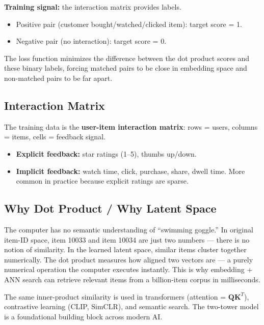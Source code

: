 \documentclass[11pt]{article}
\begin{document}
\textbf{Training signal:} the interaction matrix provides labels.
\begin{itemize}
    \item Positive pair (customer bought/watched/clicked item): target
      score = 1.
    \item Negative pair (no interaction): target score = 0.
\end{itemize}
The loss function minimizes the difference between the dot product scores
and these binary labels, forcing matched pairs to be close in embedding
space and non-matched pairs to be far apart.

\subsection{Interaction Matrix}
The training data is the \textbf{user-item interaction matrix}:
rows = users, columns = items, cells = feedback signal.
\begin{itemize}
    \item \textbf{Explicit feedback:} star ratings (1--5), thumbs up/down.
    \item \textbf{Implicit feedback:} watch time, click, purchase, share,
      dwell time. More common in practice because explicit ratings are
      sparse.
\end{itemize}

\subsection{Why Dot Product / Why Latent Space}
The computer has no semantic understanding of ``swimming goggle.''
In original item-ID space, item 10033 and item 10034 are just two numbers
--- there is no notion of similarity. In the learned latent space, similar
items cluster together numerically. The dot product measures how aligned
two vectors are --- a purely numerical operation the computer executes
instantly. This is why embedding + ANN search can retrieve relevant items
from a billion-item corpus in milliseconds.

The same inner-product similarity is used in transformers (attention
= $\mathbf{Q}\mathbf{K}^T$), contrastive learning (CLIP, SimCLR), and
semantic search. The two-tower model is a foundational building block
across modern AI.
\end{document}
